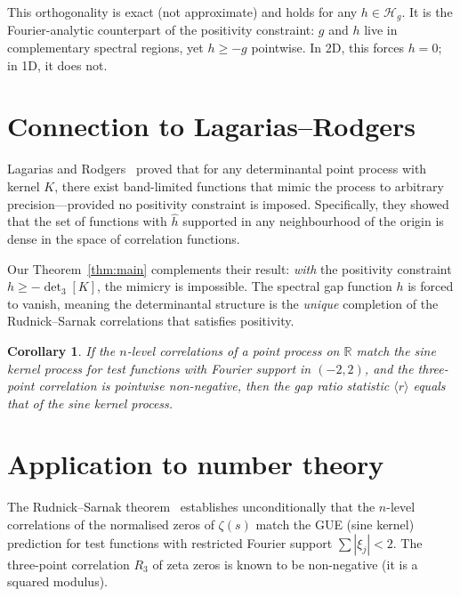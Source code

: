 \documentclass[11pt]{article}
\newtheorem{corollary}[theorem]{Corollary}
\begin{document}
This orthogonality is exact (not approximate) and holds for any
$h \in \mathcal{H}_g$. It is the Fourier-analytic counterpart of the
positivity constraint: $g$ and $h$ live in complementary spectral
regions, yet $h \geq -g$ pointwise. In 2D, this forces $h = 0$;
in 1D, it does not.


\section{Connection to Lagarias--Rodgers}

Lagarias and Rodgers~\cite{LagariaRodgers2019} proved that for any
determinantal point process with kernel $K$, there exist band-limited
functions that mimic the process to arbitrary precision---provided no
positivity constraint is imposed. Specifically, they showed that the
set of functions with $\hat{h}$ supported in any neighbourhood of the
origin is dense in the space of correlation functions.

Our Theorem~\ref{thm:main} complements their result: \emph{with}
the positivity constraint $h \geq -\det_3[K]$, the mimicry is
impossible. The spectral gap function $h$ is forced to vanish,
meaning the determinantal structure is the \emph{unique} completion
of the Rudnick--Sarnak correlations that satisfies positivity.

\begin{corollary}
If the $n$-level correlations of a point process on $\mathbb{R}$
match the sine kernel process for test functions with Fourier
support in $(-2, 2)$, and the three-point correlation is pointwise
non-negative, then the gap ratio statistic $\langle r \rangle$
equals that of the sine kernel process.
\end{corollary}


\section{Application to number theory}

The Rudnick--Sarnak theorem~\cite{RudnickSarnak1996} establishes
unconditionally that the $n$-level correlations of the normalised
zeros of $\zeta(s)$ match the GUE (sine kernel) prediction for test
functions with restricted Fourier support $\sum |\xi_j| < 2$.
The three-point correlation $R_3$ of zeta zeros is known to be
non-negative (it is a squared modulus).
\end{document}
